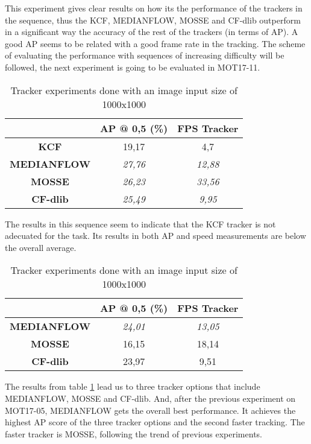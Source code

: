This experiment gives clear results on how its the performance of the trackers in the sequence, thus the KCF, MEDIANFLOW, MOSSE and CF-dlib outperform in a significant way the accuracy of the rest of the trackers (in terms of AP). A good AP seems to be related with a good frame rate in the tracking.
The scheme of evaluating the performance with sequences of increasing difficulty will be followed, the next experiment is going to be evaluated in MOT17-11.

\begin{table}[H]
\begin{center}
\begin{tabular}{|c|c|c|}
\hline
\textbf{}           & \textbf{AP @ 0,5 (\%)} & \textbf{FPS Tracker} \\ \hline
\textbf{KCF}        & 19,17                  & 4,7                  \\ \hline
\textbf{MEDIANFLOW} & \textit{27,76}         & \textit{12,88}       \\ \hline
\textbf{MOSSE}      & \textit{26,23}         & \textit{33,56}       \\ \hline
\textbf{CF-dlib}    & \textit{25,49}         & \textit{9,95}        \\ \hline
\end{tabular}
\end{center}
\caption{Tracker experiments done with an image input size of 1000x1000}
\label{tab:tracker_exp_2}
\end{table}
The results in this sequence seem to indicate that the KCF tracker is not adecuated for the task. Its results in both AP and speed measurements are below the overall average.
\begin{table}[H]
\begin{center}
\begin{tabular}{|c|c|c|}
\hline
\textbf{}           & \textbf{AP @ 0,5 (\%)} & \textbf{FPS Tracker} \\ \hline
\textbf{MEDIANFLOW} & \textit{24,01}         & \textit{13,05}       \\ \hline
\textbf{MOSSE}      & 16,15                  & 18,14               \\ \hline
\textbf{CF-dlib}    & 23,97                  & 9,51                 \\ \hline
\end{tabular}
\end{center}
\caption{Tracker experiments done with an image input size of 1000x1000}
\label{tab:tracker_exp_3}
\end{table}
The results from table \ref{tab:tracker_exp_2} lead us to three tracker options that include MEDIANFLOW, MOSSE and CF-dlib. And, after the previous experiment on MOT17-05, MEDIANFLOW gets the overall best performance. It achieves the highest AP score of the three tracker options and the second faster tracking. The faster tracker is MOSSE, following the trend of previous experiments.
